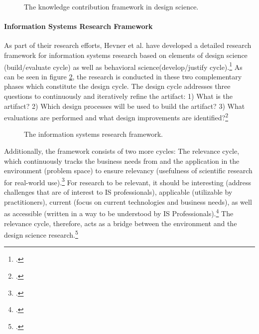 \begin{figure}
    \centering
    
    \caption[The knowledge contribution framework in design science.]{The knowledge contribution framework in design science.\protect\footnotemark}
    \label{fig:DSRKnowledgeContribution}
\end{figure}


\paragraph{Information Systems Research Framework}  \label{topic:design cycle}
As part of their research efforts, Hevner et al. have developed a detailed research framework for information systems research based on elements of design science (build/evaluate cycle) as well as behavioral science(develop/justify cycle).\footcite[Cf.][pp.80 et seq]{HevnerDesignScienceResearch2004}
As can be seen in figure \ref{fig:ISRFramework}, the research is conducted in these two complementary phases which constitute the design cycle. The design cycle addresses three questions to continuously and iteratively refine the artifact: 1) What is the artifact? 2) Which design processes will be used to build the artifact? 3) What evaluations are performed and what design improvements are identified?\footcites[Cf.][p.19]{HevnerDesignResearchInformation2010}[cf.][p.90]{Hevnerthreecycleview2007}[cf.][p.89]{Hevnerthreecycleview2007}

\begin{figure}
    \centering
    
    \caption[The information systems research framework]{The information systems research framework.\protect\footnotemark}
    \label{fig:ISRFramework}
\end{figure}


 \label{topic:relevance cycle}
Additionally, the framework consists of two more cycles: The relevance cycle, which continuously tracks the business needs from and the application in the environment (problem space) to ensure relevancy (usefulness of scientific research for real-world use).\footcites[Cf.][p.70]{Simonsciencesartificial1996}[cf.][p.79]{HevnerDesignScienceResearch2004}[cf.][p.129]{ThomasBekannteundweniger2014} For research to be relevant, it should be interesting (address challenges that are of interest to IS professionals), applicable (utilizable by practitioners), current (focus on current technologies and business needs), as well as accessible (written in a way to be understood by IS Professionals).\footcite[Cf.][p.5]{BenbasatEmpiricalresearchinformation1999} The relevance cycle, therefore, acts as a bridge between the environment and the design science research.\footcite[Cf.][p.89]{Hevnerthreecycleview2007} 

